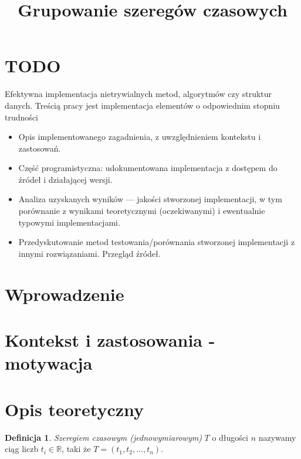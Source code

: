 \documentclass{article}
\theoremstyle{definition}
\newtheorem{defn}{Definicja}
\begin{document}
\title{Grupowanie szeregów czasowych}
\maketitle

\tableofcontents

\section{TODO}
Efektywna implementacja nietrywialnych metod, algorytmów czy struktur danych.
Treścią pracy jest implementacja elementów o odpowiednim stopniu trudności
\begin{itemize}
\item Opis implementowanego zagadnienia, z uwzględnieniem kontekstu i zastosowań.
\item Część programistyczna: udokumentowana implementacja z dostępem do źródeł i działającej wersji.
\item Analiza uzyskanych wyników — jakości stworzonej implementacji, w tym porównanie z wynikami teoretycznymi (oczekiwanymi) i ewentualnie typowymi implementacjami.
\item Przedyskutowanie metod testowania/porównania stworzonej implementacji z innymi rozwiązaniami.
Przegląd źródeł.
\end{itemize}


\section{Wprowadzenie}


\section{Kontekst i zastosowania - motywacja}

\section{Opis teoretyczny}


\begin{defn} 
\textit{Szeregiem czasowym (jednowymiarowym)} $T$ o długości $n$ nazywamy ciąg liczb $t_{i} \in \mathbb{R}$, taki że
$T = (t_{1}, t_{2}, ..., t_{n})$.
\end{defn}
\end{document}
